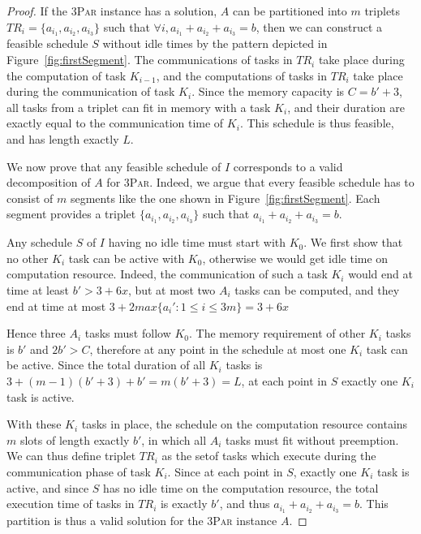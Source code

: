 \documentclass[sigconf]{acmart}
\newcommand{\threepart}{\textsc{3Par}\xspace}
\begin{document}
\begin{proof}
		
		If the \threepart instance has a solution, $A$ can be partitioned into
		$m$ triplets $TR_i = \{a_{i_1}, a_{i_2}, a_{i_3}\}$ such that $\forall
		i, a_{i_1} + a_{i_2} + a_{i_3} = b$, then we can construct a feasible
		schedule $S$ without idle times by the pattern depicted in
		Figure~\ref{fig:firstSegment}. The communications of tasks in $TR_i$ take
		place during the computation of task $K_{i-1}$, and the computations
		of tasks in $TR_i$ take place during the communication of task
		$K_i$. Since the memory capacity is $C=b'+3$, all tasks from a triplet
		can fit in memory with a task $K_i$, and their duration are exactly
		equal to the communication time of $K_i$. This schedule is thus
		feasible, and has length exactly $L$.
		
		\medskip
		
		We now prove that any feasible schedule of $I$ corresponds to a valid
		decomposition of $A$ for \threepart. Indeed, we argue that every
		feasible schedule has to consist of $m$ segments like the one shown in
		Figure~\ref{fig:firstSegment}. Each segment provides a triplet
		$\{a_{i_1}, a_{i_2}, a_{i_3}\}$ such that $a_{i_1} + a_{i_2} + a_{i_3}
		= b$.
		
		Any schedule $S$ of $I$ having no idle time must start with $K_0$. We
		first show that no other $K_i$ task can be active with $K_0$,
		otherwise we would get idle time on computation resource. Indeed, the
		communication of such a task $K_i$ would end at time at least $b'>3 +
		6x$, but at most two $A_i$ tasks can be computed, and they end at time
		at most $3+2max\{a_i':1\le i\le 3m\} = 3 + 6x$
		
		Hence three $A_i$ tasks must follow $K_0$. The memory requirement of
		other $K_i$ tasks is $b'$ and $2b'>C$, therefore at any point in the
		schedule at most one $K_i$ task can be active. Since the total
		duration of all $K_i$ tasks is $3 + (m-1)(b'+3) + b' = m (b'+3)=L$, at
		each point in $S$ exactly one $K_i$ task is active.
		
		With these $K_i$ tasks in place, the schedule on the computation
		resource contains $m$ slots of length exactly $b'$, in which all $A_i$
		tasks must fit without preemption. We can thus define triplet $TR_i$
		as the setof tasks which execute during the communication phase of
		task $K_i$. Since at each point in $S$, exactly one $K_i$ task is
		active, and since $S$ has no idle time on the computation resource,
		the total execution time of tasks in $TR_i$ is exactly $b'$, and thus
		$a_{i_1} + a_{i_2} + a_{i_3} = b$. This partition is thus a valid
		solution for the \threepart instance $A$. 
		
	\end{proof}
	
\end{document}
